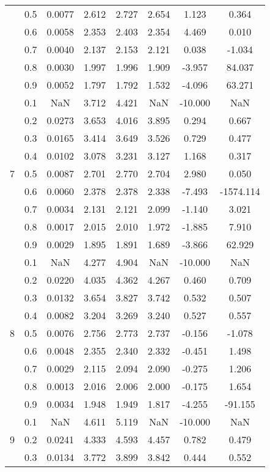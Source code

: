 \documentclass[11pt,a4paper]{report}
\begin{document}
\begin{longtable}{ | c | c || c | c | c | c | c | c | }
 & 0.5 & 0.0077 & 2.612 & 2.727 & 2.654 & 1.123 & 0.364 \\
 & 0.6 & 0.0058 & 2.353 & 2.403 & 2.354 & 4.469 & 0.010 \\
 & 0.7 & 0.0040 & 2.137 & 2.153 & 2.121 & 0.038 & -1.034 \\
 & 0.8 & 0.0030 & 1.997 & 1.996 & 1.909 & -3.957 & 84.037 \\
 & 0.9 & 0.0052 & 1.797 & 1.792 & 1.532 & -4.096 & 63.271 \\
 \hline
\multirow{9}{*}{7} & 0.1 & NaN & 3.712 & 4.421 & NaN & -10.000 & NaN \\
 & 0.2 & 0.0273 & 3.653 & 4.016 & 3.895 & 0.294 & 0.667 \\
 & 0.3 & 0.0165 & 3.414 & 3.649 & 3.526 & 0.729 & 0.477 \\
 & 0.4 & 0.0102 & 3.078 & 3.231 & 3.127 & 1.168 & 0.317 \\
 & 0.5 & 0.0087 & 2.701 & 2.770 & 2.704 & 2.980 & 0.050 \\
 & 0.6 & 0.0060 & 2.378 & 2.378 & 2.338 & -7.493 & -1574.114 \\
 & 0.7 & 0.0034 & 2.131 & 2.121 & 2.099 & -1.140 & 3.021 \\
 & 0.8 & 0.0017 & 2.015 & 2.010 & 1.972 & -1.885 & 7.910 \\
 & 0.9 & 0.0029 & 1.895 & 1.891 & 1.689 & -3.866 & 62.929 \\
 \hline
\multirow{9}{*}{8} & 0.1 & NaN & 4.277 & 4.904 & NaN & -10.000 & NaN \\
 & 0.2 & 0.0220 & 4.035 & 4.362 & 4.267 & 0.460 & 0.709 \\
 & 0.3 & 0.0132 & 3.654 & 3.827 & 3.742 & 0.532 & 0.507 \\
 & 0.4 & 0.0082 & 3.204 & 3.269 & 3.240 & 0.527 & 0.557 \\
 & 0.5 & 0.0076 & 2.756 & 2.773 & 2.737 & -0.156 & -1.078 \\
 & 0.6 & 0.0048 & 2.355 & 2.340 & 2.332 & -0.451 & 1.498 \\
 & 0.7 & 0.0029 & 2.115 & 2.094 & 2.090 & -0.275 & 1.206 \\
 & 0.8 & 0.0013 & 2.016 & 2.006 & 2.000 & -0.175 & 1.654 \\
 & 0.9 & 0.0034 & 1.948 & 1.949 & 1.817 & -4.255 & -91.155 \\
 \hline
\multirow{9}{*}{9} & 0.1 & NaN & 4.611 & 5.119 & NaN & -10.000 & NaN \\
 & 0.2 & 0.0241 & 4.333 & 4.593 & 4.457 & 0.782 & 0.479 \\
 & 0.3 & 0.0134 & 3.772 & 3.899 & 3.842 & 0.444 & 0.552 \\

\end{longtable}
\end{document}
